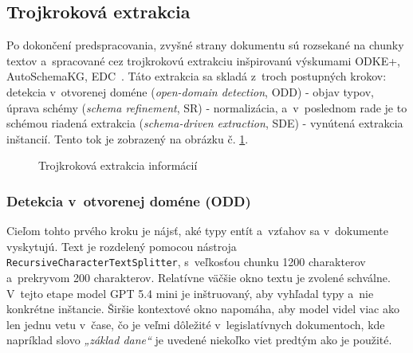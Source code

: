 \subsection{Trojkroková extrakcia}
Po dokončení predspracovania, zvyšné strany dokumentu sú rozsekané na chunky textov a~spracované cez trojkrokovú extrakciu inšpirovanú výskumami {ODKE+, AutoSchemaKG, EDC}~\cite{odkeplus2025,autoschemakg2025,edc2024}. Táto extrakcia sa skladá z~troch postupných krokov: detekcia v~otvorenej doméne (\textit{open-domain detection}, ODD) - objav typov, úprava schémy (\textit{schema refinement}, SR) - normalizácia, a~v~poslednom rade je to schémou riadená extrakcia (\textit{schema-driven extraction}, SDE) - vynútená extrakcia inštancií. Tento tok je zobrazený na obrázku č. \ref{fig:extraction}.

\begin{figure}[h]
  \centering
\caption[Trojkroková extrakcia informácií]{Trojkroková extrakcia informácií}
\label{fig:extraction}
\end{figure}

\subsubsection{Detekcia v~otvorenej doméne (ODD)}
Cieľom tohto prvého kroku je nájsť, aké typy entít a~vzťahov sa v~dokumente vyskytujú. Text je rozdelený pomocou nástroja \texttt{RecursiveCharacterTextSplitter}, s~veľkosťou chunku 1200 charakterov a~prekryvom 200 charakterov. Relatívne väčšie okno textu je zvolené schválne. V~tejto etape model GPT 5.4 mini je inštruovaný, aby vyhľadal typy a~nie konkrétne inštancie. Širšie kontextové okno napomáha, aby model videl viac ako len jednu vetu v~čase, čo je veľmi dôležité v~legislatívnych dokumentoch, kde napríklad slovo \emph{„základ dane“} je uvedené niekoľko viet predtým ako je použité. 

